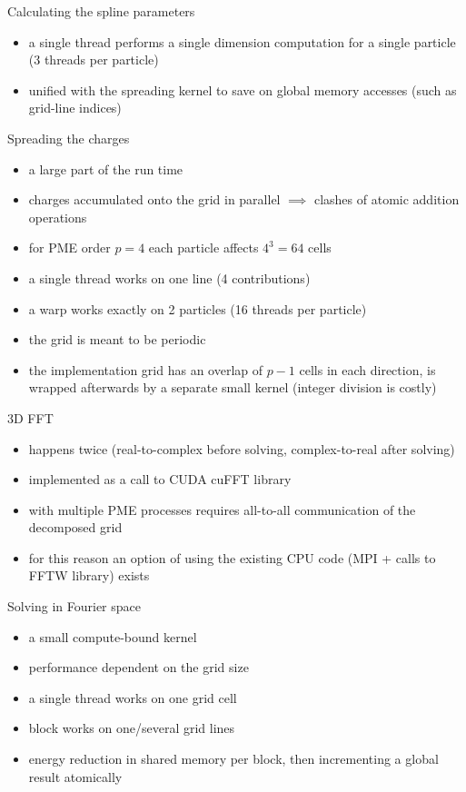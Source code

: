 \documentclass[11pt]{beamer}
\begin{document}
\begin{frame}{Calculating the spline parameters}
\begin{itemize}
\item a single thread performs a single dimension computation for a single particle (3 threads per particle)
\item unified with the spreading kernel to save on global memory accesses (such as grid-line indices) 
\end{itemize}
\end{frame}

\begin{frame}{Spreading the charges}
\begin{itemize}
\item a large part of the run time
\item charges accumulated onto the grid in parallel $\implies$ clashes of atomic 
addition operations
\item for PME order $p=4$ each particle affects $4^3 = 64$ cells
\item a single thread works on one line (4 contributions)
\item a warp works exactly on 2 particles (16 threads per particle)
\item the grid is meant to be periodic
\item the implementation grid has an overlap of $p - 1$ cells in each direction, is wrapped afterwards by a separate small kernel (integer division is costly)
\end{itemize}
\end{frame}

\begin{frame}{3D FFT}
\begin{itemize}
\item happens twice (real-to-complex before solving, complex-to-real after solving)
\item implemented as a call to CUDA cuFFT library
\item with multiple PME processes requires all-to-all communication of the decomposed grid
\item for this reason an option of using the existing CPU code (MPI + calls to FFTW library) exists
\end{itemize}
\end{frame}

\begin{frame}{Solving in Fourier space}
\begin{itemize}
\item a small compute-bound kernel
\item performance dependent on the grid size
\item a single thread works on one grid cell
\item block works on one/several grid lines
\item energy reduction in shared memory per block, then incrementing a global result atomically
\end{itemize}
\end{frame}
\end{document}
